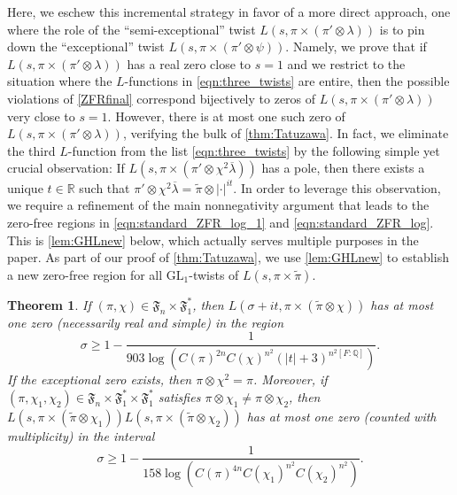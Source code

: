 \documentclass[12pt]{amsart}
\newtheorem{theorem}{Theorem}[section]
\theoremstyle{definition}
\theoremstyle{remark}
\numberwithin{equation}{section}
\theoremstyle{plain}
\renewcommand{\tilde}{\widetilde}
\renewcommand{\bar}{\overline}
\newcommand{\GL}{\mathrm{GL}}
\newcommand{\Q}{\mathbb{Q}}
\newcommand{\R}{\mathbb{R}}
\begin{document}
Here, we eschew this incremental strategy in favor of a more direct approach, one where the role of the ``semi-exceptional'' twist $L(s,\pi\times(\pi'\otimes\lambda))$ is to pin down the ``exceptional'' twist $L(s,\pi\times(\pi'\otimes\psi))$.  Namely, we prove that if $L(s,\pi\times(\pi'\otimes\lambda))$ has a real zero close to $s=1$ and we restrict to the situation where the $L$-functions in \eqref{eqn:three_twists} are entire, then the possible violations of \eqref{ZFRfinal} correspond bijectively to zeros of $L(s,\pi\times(\pi'\otimes\lambda))$ very close to $s=1$.  However, there is at most one such zero of $L(s,\pi\times(\pi'\otimes\lambda))$, verifying the bulk of \cref{thm:Tatuzawa}. In fact, we eliminate the third $L$-function from the list \eqref{eqn:three_twists} by the following simple yet crucial observation:  If $L(s,\pi\times(\pi'\otimes\chi^2\bar{\lambda}))$ has a pole, then there exists a unique $t\in\R$ such that $\pi'\otimes\chi^2\bar{\lambda}=\tilde{\pi}\otimes|\cdot|^{it}$.  In order to leverage this observation, we require a refinement of the main nonnegativity argument that leads to the zero-free regions in \eqref{eqn:standard_ZFR_log_1} and \eqref{eqn:standard_ZFR_log}.  This is \cref{lem:GHLnew} below, which actually serves multiple purposes in the paper.  As part of our proof of \cref{thm:Tatuzawa}, we use \cref{lem:GHLnew} to establish a new zero-free region for all $\GL_1$-twists of $L(s,\pi\times\tilde{\pi})$.

\begin{theorem}
\label{thm:standard_region}
If $(\pi,\chi)\in\mathfrak{F}_n\times\mathfrak{F}_1^*$, then $L(\sigma+it,\pi\times(\tilde\pi\otimes\chi))$ has at most one zero (necessarily real and simple) in the region
\begin{equation}
\label{eqn:ZFR_standard_region}
\sigma\geq 1-\frac{1}{903\log(C(\pi)^{2n}C(\chi)^{n^2}(|t|+3)^{n^2[F:\Q]})}.
\end{equation}
If the exceptional zero exists, then $\pi\otimes\chi^2=\pi$.  Moreover, if $(\pi,\chi_1,\chi_2)\in\mathfrak{F}_n\times\mathfrak{F}_1^*\times\mathfrak{F}_1^*$ satisfies $\pi\otimes\chi_1\neq\pi\otimes\chi_2$, then $L(s,\pi\times(\tilde{\pi}\otimes\chi_1))L(s,\pi\times(\tilde{\pi}\otimes\chi_2))$ has at most one zero (counted with multiplicity) in the interval
\begin{equation}
\label{twobetasinterval}
\sigma\geq 1-\frac{1}{158\log(C(\pi)^{4n}C(\chi_1)^{n^2}C(\chi_2)^{n^2})}.
\end{equation}
\end{theorem}
\end{document}

